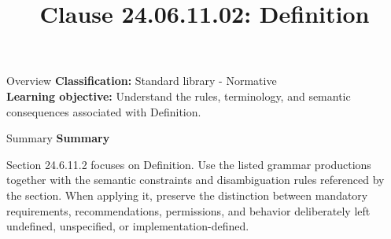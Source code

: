 \documentclass[10pt,letterpaper]{article}
\title{Clause 24.06.11.02: Definition}
\author{}
\date{}
\begin{document}
\maketitle
\begin{CornellOverviewBox}{Overview}
\textbf{Classification:} Standard library - Normative\\[2pt]
\textbf{Learning objective:} Understand the rules, terminology, and semantic consequences associated with Definition.
\end{CornellOverviewBox}\begin{CornellSummaryBox}{Summary}
{\sffamily\bfseries\color{Accent} Summary}\par\vspace{3pt}Section 24.6.11.2 focuses on Definition. Use the listed grammar productions together with the semantic constraints and disambiguation rules referenced by the section. When applying it, preserve the distinction between mandatory requirements, recommendations, permissions, and behavior deliberately left undefined, unspecified, or implementation-defined.
\end{CornellSummaryBox}
\end{document}
